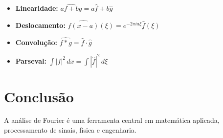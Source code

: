 \documentclass[12pt]{article}
\begin{document}
\begin{itemize}
  \item \textbf{Linearidade:} $\widehat{af + bg} = a\hat{f} + b\hat{g}$
  \item \textbf{Deslocamento:} $\widehat{f(x-a)}(\xi) = e^{-2\pi i a\xi}\hat{f}(\xi)$
  \item \textbf{Convolução:} $\widehat{f * g} = \hat{f} \cdot \hat{g}$
  \item \textbf{Parseval:} $\displaystyle\int |f|^2\,dx = \int |\hat{f}|^2\,d\xi$
\end{itemize}

\section{Conclusão}

A análise de Fourier é uma ferramenta central em matemática aplicada,
processamento de sinais, física e engenharia.
\end{document}
